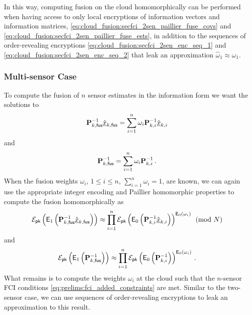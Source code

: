 In this way, computing fusion on the cloud homomorphically can be performed when having access to only local encryptions of information vectors and information matrices, \eqref{eq:cloud_fusion:secfci_2sen_paillier_fuse_covs} and \eqref{eq:cloud_fusion:secfci_2sen_paillier_fuse_ests}, in addition to the sequences of order-revealing encryptions \eqref{eq:cloud_fusion:secfci_2sen_enc_seq_1} and \eqref{eq:cloud_fusion:secfci_2sen_enc_seq_2} that leak an approximation $\hat{\omega}_1 \approx \omega_1$.

% 
% 

\subsubsection{Multi-sensor Case}\label{subsubsec:cloud_fusion:secfci_nsen}
To compute the fusion of $n$ sensor estimates in the information form we want the solutions to
\begin{equation}
    {\ensuremath{{\mathbf{P}}}}_{k,\mathsf{fus}}^{-1}\hat{{\underline{x}}}_{k,\mathsf{fus}} = \sum_{i=1}^n\omega_i{{\mathbf{P}}}_{k,i}^{-1}\hat{{\underline{x}}}_{k,i}
\end{equation}
and
\begin{equation}
    {\ensuremath{{\mathbf{P}}}}_{k,\mathsf{fus}}^{-1} = \sum_{i=1}^n\omega_i{{\mathbf{P}}}_{k,i}^{-1}\,.
\end{equation}
When the fusion weights $\omega_i$, $1\leq i\leq n$, $\sum_{i=1}^n\omega_i=1$, are known, we can again use the appropriate integer encoding and Paillier homomorphic properties to compute the fusion homomorphically as
\begin{equation}\label{eq:cloud_fusion:secfci_nsen_paillier_fuse_ests}
    \mathcal{E}_{\mathsf{pk}}\left(\mathsf{E}_1\left({{\mathbf{P}}}_{k,\mathsf{fus}}^{-1}\hat{{\underline{x}}}_{k,\mathsf{fus}}\right)\right) \approx \prod_{i=1}^n\mathcal{E}_{\mathsf{pk}}\left(\mathsf{E}_0\left({{\mathbf{P}}}^{-1}_{k,i}\hat{{\underline{x}}}_{k,i}\right)\right)^{\mathsf{E}_0(\omega_i)}\pmod{N}
\end{equation}
and
\begin{equation}\label{eq:cloud_fusion:secfci_nsen_paillier_fuse_covs}
    \mathcal{E}_{\mathsf{pk}}\left(\mathsf{E}_1\left({{\mathbf{P}}}_{k,\mathsf{fus}}^{-1}\right)\right) \approx \prod_{i=1}^n\mathcal{E}_{\mathsf{pk}}\left(\mathsf{E}_0\left({{\mathbf{P}}}^{-1}_{k,i}\right)\right)^{\mathsf{E}_0(\omega_i)}\,.
\end{equation}
What remains is to compute the weights $\omega_i$ at the cloud such that the $n$-sensor FCI conditions \eqref{eq:prelims:fci_added_constraints} are met. Similar to the two-sensor case, we can use sequences of order-revealing encryptions to leak an approximation to this result. 

